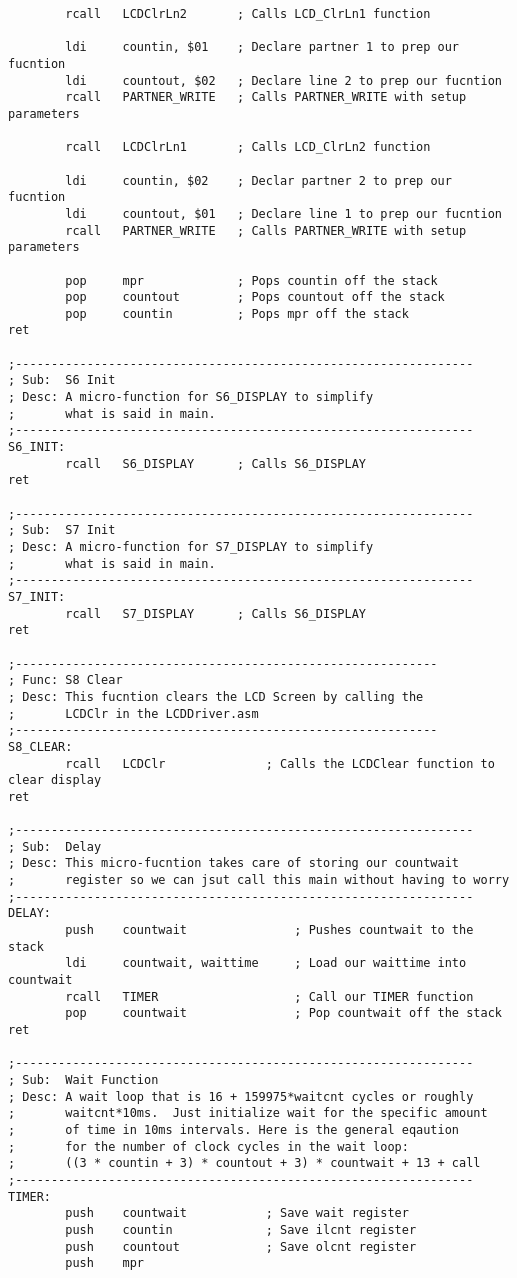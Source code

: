 \documentclass[12pt, letterpaper]{article}
\begin{document}
\begin{verbatim}
		rcall	LCDClrLn2		; Calls LCD_ClrLn1 function

		ldi		countin, $01	; Declare partner 1 to prep our fucntion
		ldi		countout, $02	; Declare line 2 to prep our fucntion
		rcall	PARTNER_WRITE	; Calls PARTNER_WRITE with setup parameters

		rcall	LCDClrLn1		; Calls LCD_ClrLn2 function

		ldi		countin, $02	; Declar partner 2 to prep our fucntion
		ldi		countout, $01	; Declare line 1 to prep our fucntion
		rcall	PARTNER_WRITE	; Calls PARTNER_WRITE with setup parameters

		pop		mpr				; Pops countin off the stack
		pop		countout		; Pops countout off the stack
		pop		countin			; Pops mpr off the stack
ret

;----------------------------------------------------------------
; Sub:	S6 Init
; Desc:	A micro-function for S6_DISPLAY to simplify
;		what is said in main.
;----------------------------------------------------------------
S6_INIT:
		rcall	S6_DISPLAY		; Calls S6_DISPLAY
ret

;----------------------------------------------------------------
; Sub:	S7 Init
; Desc:	A micro-function for S7_DISPLAY to simplify
;		what is said in main.
;----------------------------------------------------------------
S7_INIT:
		rcall	S7_DISPLAY		; Calls S6_DISPLAY
ret

;-----------------------------------------------------------
; Func: S8 Clear
; Desc: This fucntion clears the LCD Screen by calling the
;		LCDClr in the LCDDriver.asm
;-----------------------------------------------------------
S8_CLEAR:
		rcall	LCDClr				; Calls the LCDClear function to clear display	
ret

;----------------------------------------------------------------
; Sub:	Delay
; Desc:	This micro-fucntion takes care of storing our countwait
;		register so we can jsut call this main without having to worry
;----------------------------------------------------------------
DELAY:
		push	countwait				; Pushes countwait to the stack
		ldi		countwait, waittime		; Load our waittime into countwait
		rcall	TIMER					; Call our TIMER function
		pop		countwait				; Pop countwait off the stack
ret

;----------------------------------------------------------------
; Sub:	Wait Function
; Desc:	A wait loop that is 16 + 159975*waitcnt cycles or roughly 
;		waitcnt*10ms.  Just initialize wait for the specific amount 
;		of time in 10ms intervals. Here is the general eqaution
;		for the number of clock cycles in the wait loop:
;		((3 * countin + 3) * countout + 3) * countwait + 13 + call
;----------------------------------------------------------------
TIMER:
		push	countwait			; Save wait register
		push	countin				; Save ilcnt register
		push	countout			; Save olcnt register
		push	mpr


\end{verbatim}
\end{document}
